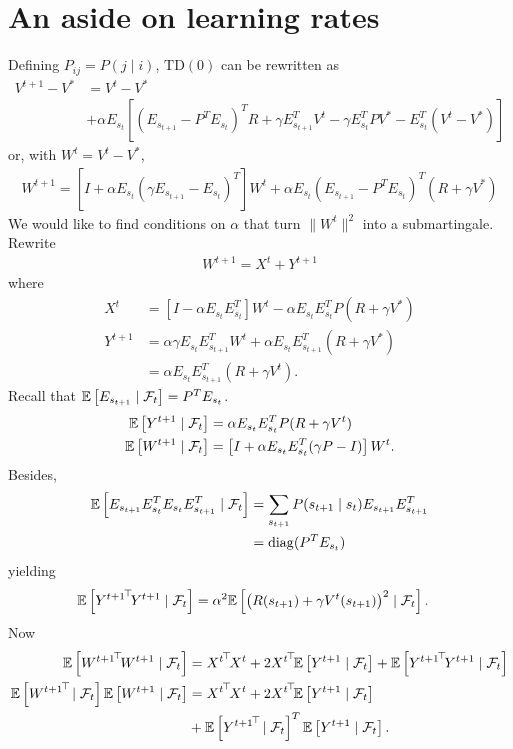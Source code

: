 \section{An aside on learning rates}
\label{sec:lr}
Defining $P_{ij} = P(j\mid i)$, $\mathrm{TD}(0)$ can be rewritten as
\begin{align*}
	V^{t+1} - V^* &= V^t - V^* \\
		      &+ \alpha E_{s_t}\left[{(E_{s_{t+1}} - P^T E_{s_t})}^T R + 
		\gamma E_{s_{t+1}}^T V^t - \gamma E_{s_t}^T P V^* - E_{s_t}^T(V^t-V^*)
	\right]
\end{align*}
or, with $W^t = V^t - V^*$,
\begin{align*}
	W^{t+1} = \left[I + \alpha E_{s_t}{(\gamma E_{s_{t+1}} - E_{s_t})}^T\right] W^t +
	\alpha E_{s_t}{(E_{s_{t+1}} - P^T E_{s_t})}^T (R + \gamma V^*)
\end{align*}
We would like to find conditions on $\alpha$ that turn $\|W^t\|^2$ into a submartingale. 
Rewrite
\begin{align*}
	W^{t+1} = X^t + Y^{t+1}
\end{align*}
where
\begin{align*}
	X^t &= \left[I - \alpha E_{s_t}E_{s_t}^T\right] W^t - 
	\alpha E_{s_t}E_{s_t}^T P{(R + \gamma V^*)}\\
	Y^{t+1} &= \alpha \gamma E_{s_t}E_{s_{t+1}}^T W^t + \alpha E_{s_t}E_{s_{t+1}}^T(R + \gamma V^*)\\
	&= \alpha E_{s_t}E_{s_{t+1}}^T(R + \gamma V^t).
\end{align*}
Recall that $\mathbb{E}\left[E_{s_{t+1}}\mid\mathcal{F}_t\right] = P^T E_{s_t}$.
\begin{align}
	\mathbb{E}\left[Y^{t+1}\mid\mathcal{F}_t\right] &= \alpha E_{s_t} E_{s_t}^T P (R + \gamma V^t)\\
	\mathbb{E}\left[W^{t+1}\mid\mathcal{F}_t\right] &= \left[I + \alpha E_{s_t}E_{s_t}^T(\gamma P - I)\right] W^t.
\end{align}
Besides,
\begin{align*}
	\mathbb{E}\left[E_{s_{t+1}}E_{s_t}^T E_{s_t} E_{s_{t+1}}^T\mid\mathcal{F}_t\right] &=
	\sum\limits_{s_{t+1}} P(s_{t+1}\mid s_t) E_{s_{t+1}} E_{s_{t+1}}^T\\
	&= \mathrm{diag}{(P^T E_{s_t})}
\end{align*}
yielding
\begin{align}
	\mathbb{E}\left[{Y^{t+1}}^{\!\top}\! Y^{t+1}\mid\mathcal{F}_t\right] &= \alpha ^ 2
	\mathbb{E}\left[{\left(R(s_{t+1}) + \gamma V^t(s_{t+1})\right)}^2\mid\mathcal{F}_t\right].
\end{align}
Now
\begin{align*}
	\Ep{\transp{{W^{t+1}}} W^{t+1}} &= \transp{{X^t}} X^t +
	2\transp{{X^t}} \Ep{Y^{t+1}}
	+ \Ep{\transp{{Y^{t+1}}}Y^{t+1}}\\
	\Ep{\transp{{W^{t+1}}}}\Ep{W^{t+1}} &= \transp{{X^t}} X^t + 2\transp{{X^t}} \Ep{Y^{t+1}}
				 \\&+ \Ep{\transp{{Y^{t+1}}}}^T\Ep{Y^{t+1}}.
\end{align*}
